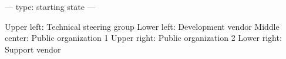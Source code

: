 ---
type: starting state
---

Upper left: Technical steering group
Lower left: Development vendor
Middle center: Public organization 1
Upper right: Public organization 2
Lower right: Support vendor
